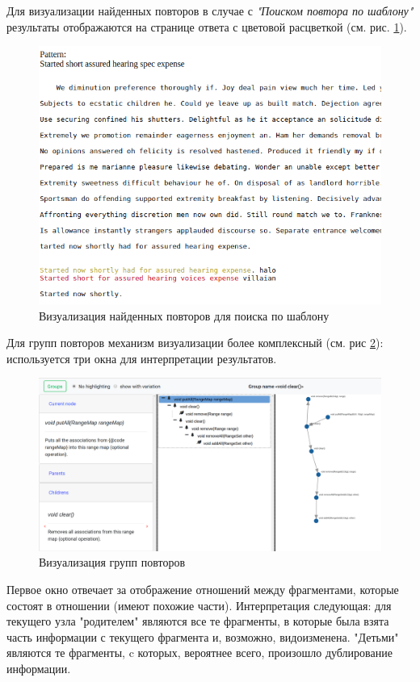 Для визуализации найденных повторов в случае с  \emph{"Поиском повтора по шаблону"} результаты отображаются на странице ответа с цветовой расцветкой (см. рис. \ref{fig:pattViz}).


\begin{figure}[H]
    \includegraphics[width=\columnwidth]{figures/outputExampleAmatch.png}
    \caption{Визуализация найденных повторов для поиска по шаблону}\label{fig:pattViz}
\end{figure}

Для групп повторов механизм визуализации более комплексный (см. рис \ref{fig:groupViz}): используется три окна для интерпретации результатов.

\begin{figure}[H]
    \includegraphics[width=\columnwidth]{figures/outputGroup.png}
    \caption{Визуализация групп повторов}\label{fig:groupViz}
\end{figure}


Первое окно отвечает за отображение отношений между фрагментами, которые состоят в отношении (имеют похожие части).
Интерпретация следующая: для текущего узла "родителем" являются все те фрагменты, в которые была взята часть информации с текущего фрагмента и, возможно, видоизменена.
"Детьми" являются те фрагменты, c которых, вероятнее всего, произошло дублирование информации.

